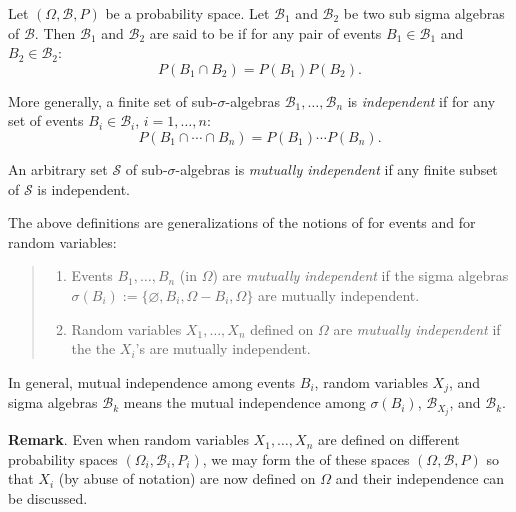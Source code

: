 \documentclass[12pt]{article}
\begin{document}

Let $(\Omega, \mathcal{B}, P)$ be a probability space.  Let $\mathcal{B}_1$ and $\mathcal{B}_2$ be two sub sigma algebras of $\mathcal{B}$.  Then $\mathcal{B}_1$ and $\mathcal{B}_2$ are said to be \emph{} if for any pair of events $B_1\in\mathcal{B}_1$ and $B_2\in\mathcal{B}_2$:
$$P(B_1\cap B_2)=P(B_1)P(B_2).$$

More generally, a finite set of sub-$\sigma$-algebras $\mathcal{B}_1,\ldots, \mathcal{B}_n$ is \emph{independent} if for any set of events $B_i\in \mathcal{B}_i$, $i=1,\ldots,n$:
$$P(B_1\cap\cdots\cap B_n)=P(B_1)\cdots P(B_n).$$

An arbitrary set $\mathcal{S}$ of sub-$\sigma$-algebras is \emph{mutually independent} if any finite subset of $\mathcal{S}$ is independent.

The above definitions are generalizations of the notions of  for events and for random variables: 
\begin{quote}
\begin{enumerate}
\item 
Events $B_1,\ldots,B_n$ (in $\Omega$) are \emph{mutually independent} if the sigma algebras $\sigma(B_i):=\lbrace \varnothing, B_i, \Omega-B_i, \Omega\rbrace$ are mutually independent.  
\item 
Random variables $X_1,\ldots,X_n$ defined on $\Omega$ are \emph{mutually independent} if the  the $X_i$'s are mutually independent.  
\end{enumerate}
\end{quote}
In general, mutual independence among events $B_i$, random variables $X_j$, and sigma algebras $\mathcal{B}_k$ means the mutual independence among $\sigma(B_i)$, $\mathcal{B}_{X_j}$, and $\mathcal{B}_k$.

\textbf{Remark}.  Even when random variables $X_1,\ldots, X_n$ are defined on different probability spaces $(\Omega_i,\mathcal{B}_i,P_i)$, we may form the  of these spaces $(\Omega,\mathcal{B},P)$ so that $X_i$ (by abuse of notation) are now defined on $\Omega$ and their independence can be discussed.
\end{document}
